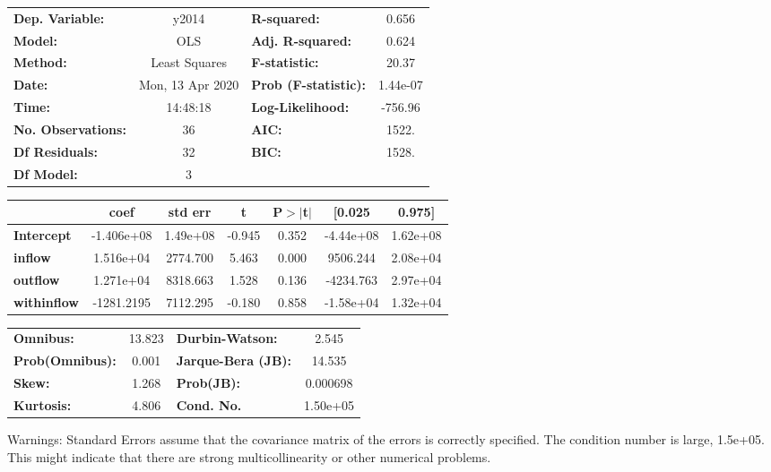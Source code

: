 \begin{center}
\begin{tabular}{lclc}
\toprule
\textbf{Dep. Variable:}    &      y2014       & \textbf{  R-squared:         } &     0.656   \\
\textbf{Model:}            &       OLS        & \textbf{  Adj. R-squared:    } &     0.624   \\
\textbf{Method:}           &  Least Squares   & \textbf{  F-statistic:       } &     20.37   \\
\textbf{Date:}             & Mon, 13 Apr 2020 & \textbf{  Prob (F-statistic):} &  1.44e-07   \\
\textbf{Time:}             &     14:48:18     & \textbf{  Log-Likelihood:    } &   -756.96   \\
\textbf{No. Observations:} &          36      & \textbf{  AIC:               } &     1522.   \\
\textbf{Df Residuals:}     &          32      & \textbf{  BIC:               } &     1528.   \\
\textbf{Df Model:}         &           3      & \textbf{                     } &             \\
\bottomrule
\end{tabular}
\begin{tabular}{lcccccc}
                    & \textbf{coef} & \textbf{std err} & \textbf{t} & \textbf{P$> |$t$|$} & \textbf{[0.025} & \textbf{0.975]}  \\
\midrule
\textbf{Intercept}  &   -1.406e+08  &     1.49e+08     &    -0.945  &         0.352        &    -4.44e+08    &     1.62e+08     \\
\textbf{inflow}     &    1.516e+04  &     2774.700     &     5.463  &         0.000        &     9506.244    &     2.08e+04     \\
\textbf{outflow}    &    1.271e+04  &     8318.663     &     1.528  &         0.136        &    -4234.763    &     2.97e+04     \\
\textbf{withinflow} &   -1281.2195  &     7112.295     &    -0.180  &         0.858        &    -1.58e+04    &     1.32e+04     \\
\bottomrule
\end{tabular}
\begin{tabular}{lclc}
\textbf{Omnibus:}       & 13.823 & \textbf{  Durbin-Watson:     } &    2.545  \\
\textbf{Prob(Omnibus):} &  0.001 & \textbf{  Jarque-Bera (JB):  } &   14.535  \\
\textbf{Skew:}          &  1.268 & \textbf{  Prob(JB):          } & 0.000698  \\
\textbf{Kurtosis:}      &  4.806 & \textbf{  Cond. No.          } & 1.50e+05  \\
\bottomrule
\end{tabular}
\end{center}

Warnings: \newline
 [1] Standard Errors assume that the covariance matrix of the errors is correctly specified. \newline
 [2] The condition number is large, 1.5e+05. This might indicate that there are \newline
 strong multicollinearity or other numerical problems.